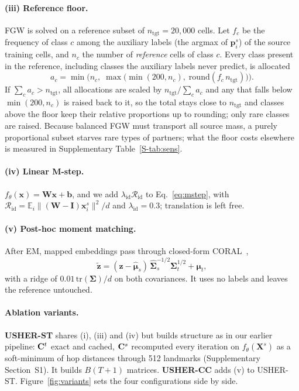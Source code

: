 \paragraph{(iii) Reference floor.} FGW is solved on a reference subset of $n_{\mathrm{tgt}}=20{,}000$ cells. Let $f_c$
be the frequency of class $c$ among the auxiliary labels (the argmax of $\mathbf{p}^{s}_{i}$) of the source training
cells, and $n_c$ the number of \emph{reference} cells of class $c$. Every class present in the reference, including
classes the auxiliary labels never predict, is allocated
\[
  a_c=\min\bigl(n_c,\;\max\bigl(\min(200,n_c),\;\mathrm{round}(f_c\,n_{\mathrm{tgt}})\bigr)\bigr).
\]
If $\sum_c a_c>n_{\mathrm{tgt}}$, all allocations are scaled by $n_{\mathrm{tgt}}/\sum_c a_c$ and any that falls below
$\min(200,n_c)$ is raised back to it, so the total stays close to $n_{\mathrm{tgt}}$ and classes above the floor keep
their relative proportions up to rounding; only rare classes are raised. Because balanced FGW must transport all source mass, a
purely proportional subset starves rare types of partners; what the floor costs elsewhere is measured in
Supplementary Table~\ref{S-tab:sens}.

\paragraph{(iv) Linear M-step.} $f_\theta(\mathbf{x})=\mathbf{W}\mathbf{x}+\mathbf{b}$, and we add
$\lambda_{\mathrm{id}}\mathcal{R}_{\mathrm{id}}$ to Eq.~\eqref{eq:mstep}, with
$\mathcal{R}_{\mathrm{id}}=\mathbb{E}_i\|(\mathbf{W}-\mathbf{I})\mathbf{x}^{s}_{i}\|^{2}/d$ and
$\lambda_{\mathrm{id}}=0.3$; translation is left free.

\paragraph{(v) Post-hoc moment matching.} After EM, mapped embeddings pass through closed-form
CORAL~\citep{sun2016coral},
\begin{equation}\label{eq:coral}
  \tilde{\mathbf{z}}=(\mathbf{z}-\hat{\bm{\mu}}_{s})\,\hat{\bm{\Sigma}}_{s}^{-1/2}\bm{\Sigma}_{t}^{1/2}+\bm{\mu}_{t},
\end{equation}
with a ridge of $0.01\,\mathrm{tr}(\bm{\Sigma})/d$ on both covariances. It uses no labels and leaves the reference
untouched.

\paragraph{Ablation variants.} \textbf{USHER-ST} shares (i), (iii) and (iv) but builds structure as in our earlier
pipeline: $\mathbf{C}^{t}$ exact and cached, $\mathbf{C}^{s}$ recomputed every iteration on $f_\theta(\mathbf{X}^{s})$ as a soft-minimum of hop
distances through 512 landmarks (Supplementary Section~S1). It builds $B(T+1)$ matrices. \textbf{USHER-CC} adds (v) to
USHER-ST. Figure~\ref{fig:variants} sets the four configurations side by side.

